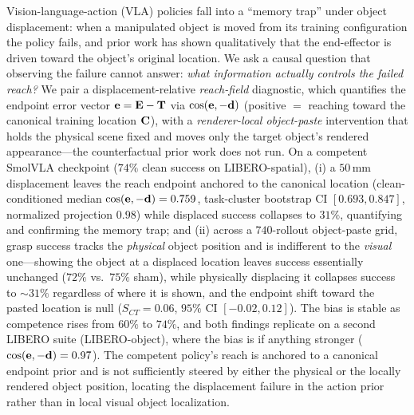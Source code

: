 Vision-language-action (VLA) policies fall into a ``memory trap'' under object displacement: when a manipulated object is moved from its training configuration the policy fails, and prior work has shown qualitatively that the end-effector is driven toward the object's original location. We ask a causal question that observing the failure cannot answer: \emph{what information actually controls the failed reach?} We pair a displacement-relative \emph{reach-field} diagnostic, which quantifies the endpoint error vector $\mathbf{e}=\mathbf{E}-\mathbf{T}$ via $\operatorname{cos}(\mathbf{e},-\mathbf{d})$ (positive $=$ reaching toward the canonical training location $\mathbf{C}$), with a \emph{renderer-local object-paste} intervention that holds the physical scene fixed and moves only the target object's rendered appearance---the counterfactual prior work does not run. On a competent SmolVLA checkpoint ($74\%$ clean success on LIBERO-spatial), (i) a $50$\,mm displacement leaves the reach endpoint anchored to the canonical location (clean-conditioned median $\operatorname{cos}(\mathbf{e},-\mathbf{d})=0.759$, task-cluster bootstrap CI $[0.693,0.847]$, normalized projection $0.98$) while displaced success collapses to $31\%$, quantifying and confirming the memory trap; and (ii) across a $740$-rollout object-paste grid, grasp success tracks the \emph{physical} object position and is indifferent to the \emph{visual} one---showing the object at a displaced location leaves success essentially unchanged ($72\%$ vs.\ $75\%$ sham), while physically displacing it collapses success to ${\sim}31\%$ regardless of where it is shown, and the endpoint shift toward the pasted location is null ($S_{CT}=0.06$, $95\%$ CI $[-0.02,0.12]$). The bias is stable as competence rises from $60\%$ to $74\%$, and both findings replicate on a second LIBERO suite (LIBERO-object), where the bias is if anything stronger ($\operatorname{cos}(\mathbf{e},-\mathbf{d})=0.97$). The competent policy's reach is anchored to a canonical endpoint prior and is not sufficiently steered by either the physical or the locally rendered object position, locating the displacement failure in the action prior rather than in local visual object localization.
